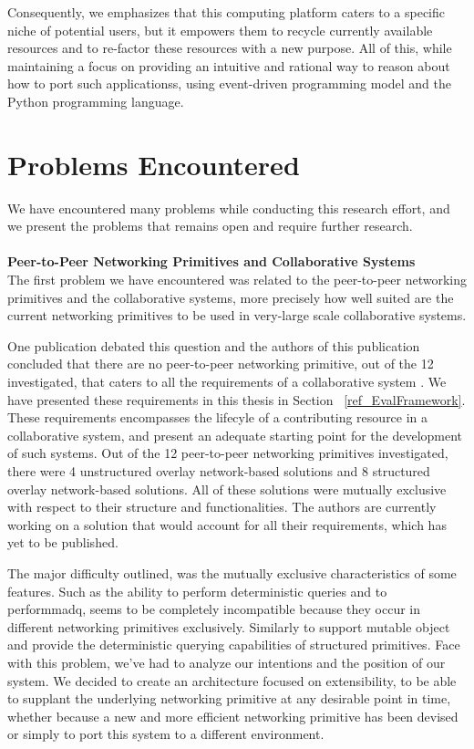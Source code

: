 \documentclass[12pt, titlepage]{uo_temp}
\begin{document}
     Consequently, we emphasizes that this computing platform caters to a specific niche
     of potential users, but it empowers them to recycle currently available resources and
     to re-factor these resources with a new purpose. All of this, while maintaining a
     focus on providing an intuitive and rational way to reason about how to port such
     applicationss, using event-driven programming model and the Python programming language.
   
     \section{Problems Encountered}
     We have encountered many problems while conducting this research effort, and
     we present the problems that remains open and require further research. \\

     \\ \textbf{Peer-to-Peer Networking Primitives and Collaborative Systems}\\
     The first problem we have encountered was related to the peer-to-peer networking
     primitives and the collaborative systems, more precisely how well suited are the current
     networking primitives to be used in very-large scale collaborative systems. 

     One publication debated this question and the authors of this publication concluded
     that there are no peer-to-peer networking primitive, out of the 12 investigated, that
     caters to all the requirements of a collaborative system \cite{p2pcollab}. We have
     presented these requirements in this thesis in Section ~\ref{ref_EvalFramework}.
     These requirements encompasses the lifecyle of a contributing resource in a
     collaborative system, and present an adequate starting point for the development of
     such systems. Out of the 12 peer-to-peer networking primitives investigated, there
     were 4 unstructured overlay network-based solutions and 8 structured overlay
     network-based solutions. All of these solutions were mutually exclusive with respect
     to their structure and functionalities. The authors are currently working on a
     solution that would account for all their requirements, which has yet to be
     published.

     The major difficulty outlined, was the mutually exclusive characteristics of some
     features. Such as the ability to perform deterministic queries and to
     perform\gls{madq}, seems to be completely incompatible because they occur in
     different networking primitives exclusively. Similarly to support mutable object and
     provide the deterministic querying capabilities of structured primitives.  Face with
     this problem, we've had to analyze our intentions and the position of our system. We
     decided to create an architecture focused on extensibility, to be able to supplant
     the underlying networking primitive at any desirable point in time, whether because a
     new and more efficient networking primitive has been devised or simply to port this
     system to a different environment.
     
\end{document}
